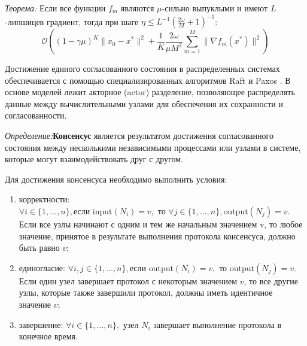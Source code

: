 \textit{Теорема:}\cite{stich2019unified} Если все функции $f_m$ являются $\mu$-сильно выпуклыми
и имеют $L$-липшицев градиент, тогда при шаге $\eta \le L^{-1} (\frac{2 \omega}{M}+1)^{-1}$:
\begin{equation}
    \mathcal{O}\left(
        (1-\gamma \mu)^K \|x_0 -x^*\|^2 + \frac{1}{K} \frac{2 \omega}{\mu M^2} \sum_{m=1}^M \| \nabla f_m(x^*) \|^2
    \right)
\end{equation}

Достижение единого согласованного состояния в распределенных системах обеспечивается с помощью специализированных алгоритмов  
Raft \cite{lamport2019time} и Paxos \cite{pease1980reaching}. 
В основе моделей лежит акторное (actor) разделение, позволяющее распределять данные между вычислительными узлами для обеспечения их 
сохранности и согласованности. 

\textit{Определение:}\textbf{Консенсус} является результатом достижения согласованного состояния между несколькими независимыми 
процессами или узлами в системе, которые могут взаимодействовать друг с другом. 

Для достижения консенсуса необходимо выполнить условия:
 \begin{enumerate}
    \item корректности: $\forall i \in \{1, \ldots, n\}, \text{если } \text{input}(N_i) = v, \text{ то } \forall j \in \{1, \ldots, n\}, \text{output}(N_j) = v$.
     Если все узлы начинают с одним и тем же начальным значением v, то любое значение, принятое в результате 
     выполнения протокола консенсуса, должно быть равно \( v \);
    \item единогласие: $\forall i, j \in \{1, \ldots, n\}, \text{если } \text{output}(N_i) = v, \text{ то } \text{output}(N_j) = v$.
     Если один узел завершает протокол с некоторым значением \( v \), то все другие узлы, которые также завершили протокол,
     должны иметь идентичное значение \( v \);
    \item завершение: $\forall i \in \{1, \ldots, n\}, \text{ узел } N_i$ 
    завершает выполнение протокола в конечное время.
\end{enumerate}


